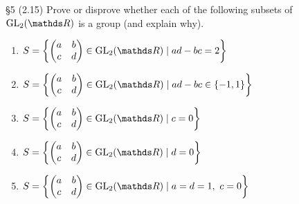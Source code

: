 \documentclass{homework}
\begin{document}
\begin{problem}{\S 5}
  (2.15) Prove or disprove whether each of the following subsets of $\GL_2(\R)$ is a group (and
  explain why).
  \begin{enumerate}[label=(\alph*)]
    \item $S = \left\{\begin{pmatrix} a&b\\c&d \end{pmatrix} \in \GL_2(\R)\mid ad-bc=2 \right\} $
    \item $S = \left\{\begin{pmatrix} a&b\\c&d \end{pmatrix} \in \GL_2(\R)\mid ad-bc\in \{ -1,1 \}\right\} $
    \item $S = \left\{\begin{pmatrix} a&b\\c&d \end{pmatrix} \in \GL_2(\R)\mid c=0\right\} $
    \item $S = \left\{\begin{pmatrix} a&b\\c&d \end{pmatrix} \in \GL_2(\R)\mid d=0\right\} $
    \item $S = \left\{\begin{pmatrix} a&b\\c&d \end{pmatrix} \in \GL_2(\R)\mid a=d=1,\ c=0\right\} $
  \end{enumerate}
\end{problem}
\end{document}
